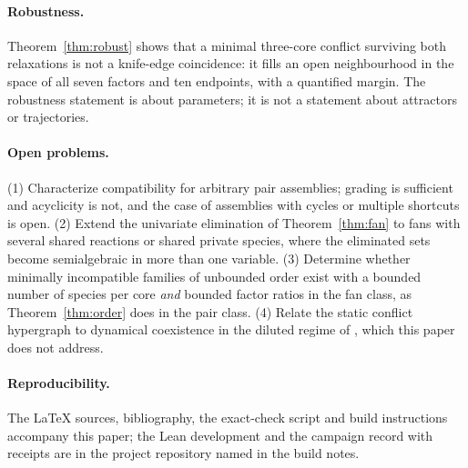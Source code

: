 \documentclass[11pt,a4paper]{article}
\theoremstyle{plain}
\theoremstyle{definition}
\theoremstyle{remark}
\begin{document}
\paragraph{Robustness.} Theorem~\ref{thm:robust} shows that a minimal three-core conflict surviving both relaxations is not a knife-edge coincidence: it fills an open neighbourhood in the space of all seven factors and ten endpoints, with a quantified margin. The robustness statement is about parameters; it is not a statement about attractors or trajectories.

\paragraph{Open problems.} (1) Characterize compatibility for arbitrary pair assemblies; grading is sufficient and acyclicity is not, and the case of assemblies with cycles or multiple shortcuts is open. (2) Extend the univariate elimination of Theorem~\ref{thm:fan} to fans with several shared reactions or shared private species, where the eliminated sets become semialgebraic in more than one variable. (3) Determine whether minimally incompatible families of unbounded order exist with a bounded number of species per core \emph{and} bounded factor ratios in the fan class, as Theorem~\ref{thm:order} does in the pair class. (4) Relate the static conflict hypergraph to dynamical coexistence in the diluted regime of \citep{unterberger2022,nandan2025}, which this paper does not address.

\paragraph{Reproducibility.} The LaTeX sources, bibliography, the exact-check script and build instructions accompany this paper; the Lean development and the campaign record with receipts are in the project repository named in the build notes.



\end{document}
